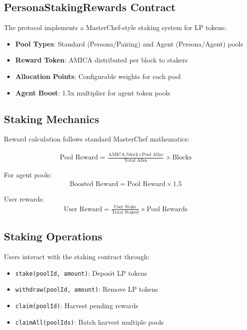 \documentclass{article}
\begin{document}
\subsection{PersonaStakingRewards Contract}

The protocol implements a MasterChef-style staking system for LP tokens:

\begin{itemize}
    \item \textbf{Pool Types}: Standard (Persona/Pairing) and Agent (Persona/Agent) pools
    \item \textbf{Reward Token}: AMICA distributed per block to stakers
    \item \textbf{Allocation Points}: Configurable weights for each pool
    \item \textbf{Agent Boost}: 1.5x multiplier for agent token pools
\end{itemize}

\subsection{Staking Mechanics}

Reward calculation follows standard MasterChef mathematics:

\begin{align}
\text{Pool Reward} = \frac{\text{AMICA/block} \times \text{Pool Alloc}}{\text{Total Alloc}} \times \text{Blocks}
\end{align}

For agent pools:
\begin{align}
\text{Boosted Reward} = \text{Pool Reward} \times 1.5
\end{align}

User rewards:
\begin{align}
\text{User Reward} = \frac{\text{User Stake}}{\text{Total Staked}} \times \text{Pool Rewards}
\end{align}

\subsection{Staking Operations}

Users interact with the staking contract through:
\begin{itemize}
    \item \texttt{stake(poolId, amount)}: Deposit LP tokens
    \item \texttt{withdraw(poolId, amount)}: Remove LP tokens
    \item \texttt{claim(poolId)}: Harvest pending rewards
    \item \texttt{claimAll(poolIds)}: Batch harvest multiple pools
\end{itemize}
\end{document}
